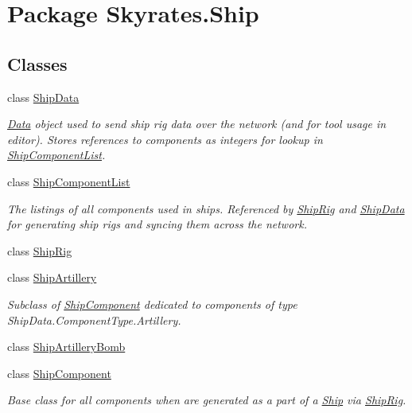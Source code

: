 \hypertarget{namespace_skyrates_1_1_ship}{\section{Package Skyrates.\-Ship}
\label{namespace_skyrates_1_1_ship}
}
\subsection*{Classes}
\begin{DoxyCompactItemize}
\item 
class \hyperlink{class_skyrates_1_1_ship_1_1_ship_data}{Ship\-Data}
\begin{DoxyCompactList}\small\item\em \hyperlink{namespace_skyrates_1_1_data}{Data} object used to send ship rig data over the network (and for tool usage in editor). Stores references to components as integers for lookup in \hyperlink{class_skyrates_1_1_ship_1_1_ship_component_list}{Ship\-Component\-List}. \end{DoxyCompactList}\item 
class \hyperlink{class_skyrates_1_1_ship_1_1_ship_component_list}{Ship\-Component\-List}
\begin{DoxyCompactList}\small\item\em The listings of all components used in ships. Referenced by \hyperlink{class_skyrates_1_1_ship_1_1_ship_rig}{Ship\-Rig} and \hyperlink{class_skyrates_1_1_ship_1_1_ship_data}{Ship\-Data} for generating ship rigs and syncing them across the network. \end{DoxyCompactList}\item 
class \hyperlink{class_skyrates_1_1_ship_1_1_ship_rig}{Ship\-Rig}
\item 
class \hyperlink{class_skyrates_1_1_ship_1_1_ship_artillery}{Ship\-Artillery}
\begin{DoxyCompactList}\small\item\em Subclass of \hyperlink{class_skyrates_1_1_ship_1_1_ship_component}{Ship\-Component} dedicated to components of type Ship\-Data.\-Component\-Type.\-Artillery. \end{DoxyCompactList}\item 
class \hyperlink{class_skyrates_1_1_ship_1_1_ship_artillery_bomb}{Ship\-Artillery\-Bomb}
\item 
class \hyperlink{class_skyrates_1_1_ship_1_1_ship_component}{Ship\-Component}
\begin{DoxyCompactList}\small\item\em Base class for all components when are generated as a part of a \hyperlink{namespace_skyrates_1_1_ship}{Ship} via \hyperlink{class_skyrates_1_1_ship_1_1_ship_rig}{Ship\-Rig}. \end{DoxyCompactList}\item 

\end{DoxyCompactItemize}
